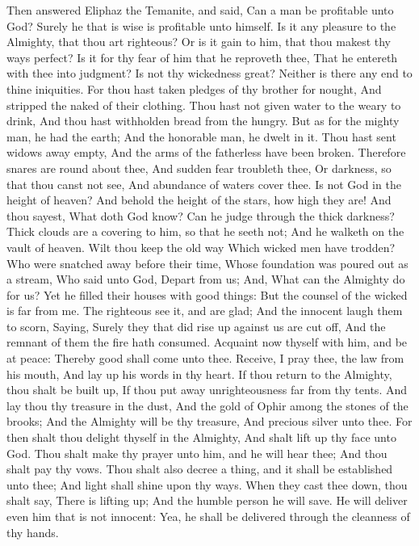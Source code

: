 Then answered Eliphaz the Temanite, and said,  Can a man be profitable unto God? Surely he that is wise is profitable unto himself.  Is it any pleasure to the Almighty, that thou art righteous? Or is it gain to him, that thou makest thy ways perfect?  Is it for thy fear of him that he reproveth thee, That he entereth with thee into judgment?  Is not thy wickedness great? Neither is there any end to thine iniquities.  For thou hast taken pledges of thy brother for nought, And stripped the naked of their clothing.  Thou hast not given water to the weary to drink, And thou hast withholden bread from the hungry.  But as for the mighty man, he had the earth; And the honorable man, he dwelt in it.  Thou hast sent widows away empty, And the arms of the fatherless have been broken.  Therefore snares are round about thee, And sudden fear troubleth thee,  Or darkness, so that thou canst not see, And abundance of waters cover thee.  Is not God in the height of heaven? And behold the height of the stars, how high they are!  And thou sayest, What doth God know? Can he judge through the thick darkness?  Thick clouds are a covering to him, so that he seeth not; And he walketh on the vault of heaven.  Wilt thou keep the old way Which wicked men have trodden?  Who were snatched away before their time, Whose foundation was poured out as a stream,  Who said unto God, Depart from us; And, What can the Almighty do for us?  Yet he filled their houses with good things: But the counsel of the wicked is far from me.  The righteous see it, and are glad; And the innocent laugh them to scorn,  Saying, Surely they that did rise up against us are cut off, And the remnant of them the fire hath consumed.  Acquaint now thyself with him, and be at peace: Thereby good shall come unto thee.  Receive, I pray thee, the law from his mouth, And lay up his words in thy heart.  If thou return to the Almighty, thou shalt be built up, If thou put away unrighteousness far from thy tents.  And lay thou thy treasure in the dust, And the gold of Ophir among the stones of the brooks;  And the Almighty will be thy treasure, And precious silver unto thee.  For then shalt thou delight thyself in the Almighty, And shalt lift up thy face unto God.  Thou shalt make thy prayer unto him, and he will hear thee; And thou shalt pay thy vows.  Thou shalt also decree a thing, and it shall be established unto thee; And light shall shine upon thy ways.  When they cast thee down, thou shalt say, There is lifting up; And the humble person he will save.  He will deliver even him that is not innocent: Yea, he shall be delivered through the cleanness of thy hands. 

